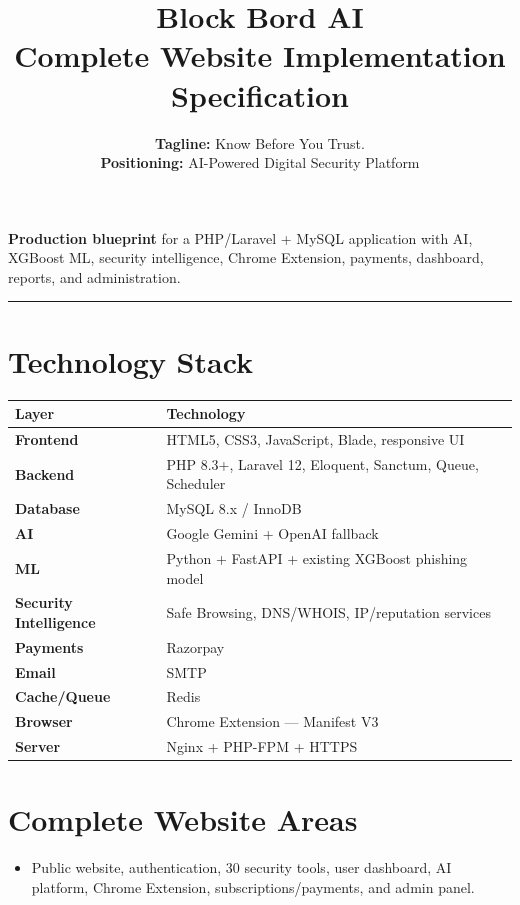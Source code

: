 \documentclass[11pt,a4paper]{article}
\title{\textbf{\Huge Block Bord AI}\\[0.4em] \Large Complete Website Implementation Specification}
\author{\textbf{Tagline:} Know Before You Trust. \\ \textbf{Positioning:} AI-Powered Digital Security Platform}
\date{}
\begin{document}
\maketitle
\thispagestyle{fancy}

\noindent\textbf{Production blueprint} for a PHP/Laravel + MySQL application with AI, XGBoost ML, security intelligence, Chrome Extension, payments, dashboard, reports, and administration.

\vspace{1em}
\hrule
\vspace{1em}

\section{Technology Stack}

\begin{table}[h!]
\centering
\begin{tabularx}{\textwidth}{l X}
\toprule
\textbf{Layer} & \textbf{Technology} \\
\midrule
\textbf{Frontend} & HTML5, CSS3, JavaScript, Blade, responsive UI \\
\textbf{Backend} & PHP 8.3+, Laravel 12, Eloquent, Sanctum, Queue, Scheduler \\
\textbf{Database} & MySQL 8.x / InnoDB \\
\textbf{AI} & Google Gemini + OpenAI fallback \\
\textbf{ML} & Python + FastAPI + existing XGBoost phishing model \\
\textbf{Security Intelligence} & Safe Browsing, DNS/WHOIS, IP/reputation services \\
\textbf{Payments} & Razorpay \\
\textbf{Email} & SMTP \\
\textbf{Cache/Queue} & Redis \\
\textbf{Browser} & Chrome Extension — Manifest V3 \\
\textbf{Server} & Nginx + PHP-FPM + HTTPS \\
\bottomrule
\end{tabularx}
\end{table}

\section{Complete Website Areas}
\begin{itemize}[noitemsep]
    \item Public website, authentication, 30 security tools, user dashboard, AI platform, Chrome Extension, subscriptions/payments, and admin panel.
\end{itemize}
\end{document}
